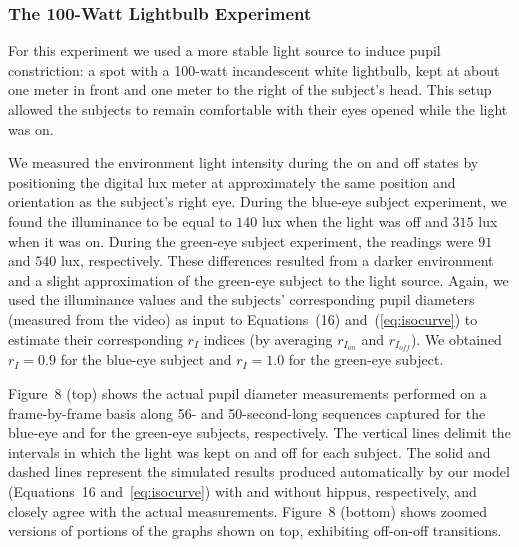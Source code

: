 \documentclass{acmtog} %
\begin{document}
\subsubsection{The 100-Watt Lightbulb Experiment}
\label{sec:luxMeterExperiment}
For this experiment we used a more stable light source to induce pupil
constriction: a spot with a 100-watt incandescent white lightbulb, kept
at about one meter in front and one meter to the right of the subject's
head. This setup allowed the subjects to remain comfortable with their
eyes opened while the light was on.

We measured the environment light intensity during the {on} and {off}
states by positioning the digital lux meter at approximately the same
position and orientation as the subject's right eye. During the blue-eye
subject experiment, we found the illuminance to be equal to $140$ lux
when the light was off and $315$ lux when it was on. During the
green-eye subject experiment, the readings were $91$ and $540$ lux,
respectively. These differences resulted from a darker environment and a
slight approximation of the green-eye subject to the light source.
Again, we used the illuminance values and the subjects' corresponding
pupil diameters (measured from the video) as input to Equations~(16)
and~(\ref{eq:isocurve}) to estimate their corresponding $r_I$ indices
(by averaging $r_{I_{on}}$ and $r_{I_{off}}$). We obtained $r_I = 0.9$
for the blue-eye subject and $r_I = 1.0$ for the green-eye subject.

Figure~8 (top) shows the actual pupil diameter measurements performed on
a frame-by-frame basis along 56- and 50-second-long sequences captured
for the blue-eye and for the green-eye subjects, respectively. The
vertical lines delimit the intervals in which the light was kept {on}
and {off} for each subject. The solid and dashed lines represent the
simulated results produced automatically by our model (Equations~16
and~\ref{eq:isocurve}) with and without hippus, respectively, and
closely agree with the actual measurements. Figure~8 (bottom) shows
zoomed versions of portions of the graphs shown on top, exhibiting
{off-on-off} transitions.
\end{document}
